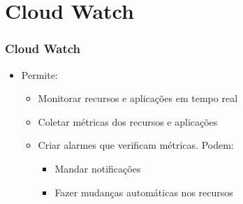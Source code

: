 \section{Cloud Watch}

\begin{frame}
	\frametitle{Cloud Watch}
	\begin{itemize}
		\item Permite:
			\begin{itemize}
				\item Monitorar recursos e aplicações em tempo real
				\item Coletar métricas dos recursos e aplicações
				\item Criar alarmes que verificam métricas. Podem:
					\begin{itemize}
						\item Mandar notificações
						\item Fazer mudanças automáticas nos recursos
					\end{itemize}
			\end{itemize}
	\end{itemize}
\end{frame}

